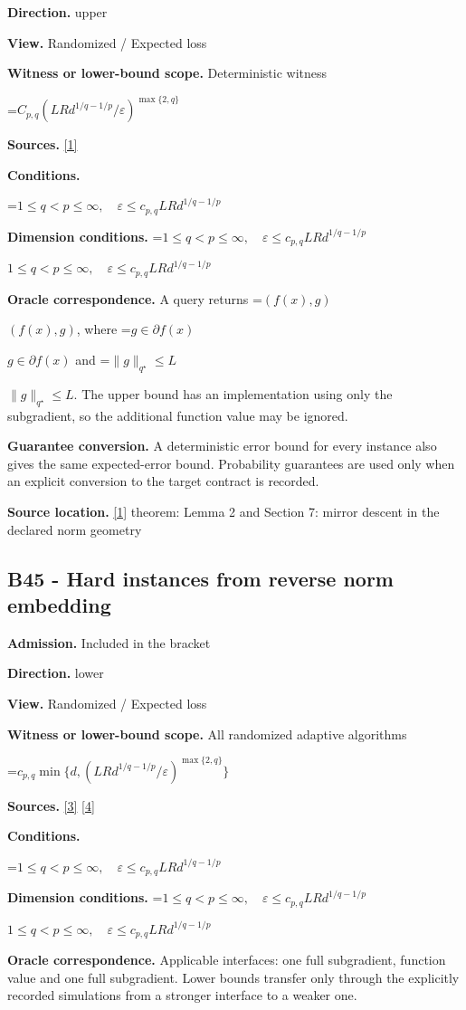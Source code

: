 \documentclass[10pt,a4paper]{article}
\newcommand{\AtlasMath}[1]{\par\begingroup\centering\setbox0=\hbox{$\displaystyle #1$}\ifdim\wd0>1.4\linewidth\typeout{ATLAS WIDE FORMULA: \the\wd0}\fi\ifdim\wd0>\linewidth\resizebox{\linewidth}{!}{\box0}\else\box0\fi\par\endgroup}
\newcommand{\AtlasInlineMath}[1]{\begingroup\setbox0=\hbox{$#1$}\ifdim\wd0>.4\linewidth\endgroup\AtlasMath{#1}\else\endgroup$#1$\fi}
\begin{document}
\textbf{Direction.} upper

\textbf{View.} Randomized / Expected loss

\textbf{Witness or lower-bound scope.} Deterministic witness

\AtlasMath{C_{p,q}(LRd^{1/q-1/p}/\varepsilon)^{\max\{2,q\}}}
\textbf{Sources.} \href{https://arxiv.org/pdf/1107.4080}{[1]}

\textbf{Conditions.} 
\AtlasMath{1\le q<p\le\infty,\quad\varepsilon\le c_{p,q}LRd^{1/q-1/p}}


\textbf{Dimension conditions.} \AtlasInlineMath{1\le q<p\le\infty,\quad\varepsilon\le c_{p,q}LRd^{1/q-1/p}}

\textbf{Oracle correspondence.} A query returns \AtlasInlineMath{(f(x),g)}, where \AtlasInlineMath{g\in\partial f(x)} and \AtlasInlineMath{\|g\|_{q^\star}\le L}. The upper bound has an implementation using only the subgradient, so the additional function value may be ignored.

\textbf{Guarantee conversion.} A deterministic error bound for every instance also gives the same expected-error bound. Probability guarantees are used only when an explicit conversion to the target contract is recorded.

\textbf{Source location.} \href{https://arxiv.org/pdf/1107.4080}{[1]} theorem: Lemma 2 and Section 7: mirror descent in the declared norm geometry

\subsection{B45 - Hard instances from reverse norm embedding}
\textbf{Admission.} Included in the bracket

\textbf{Direction.} lower

\textbf{View.} Randomized / Expected loss

\textbf{Witness or lower-bound scope.} All randomized adaptive algorithms

\AtlasMath{c_{p,q}\min\{d,(LRd^{1/q-1/p}/\varepsilon)^{\max\{2,q\}}\}}
\textbf{Sources.} \href{https://arxiv.org/pdf/2609.20701}{[3]} \href{https://arxiv.org/pdf/2609.20687}{[4]}

\textbf{Conditions.} 
\AtlasMath{1\le q<p\le\infty,\quad\varepsilon\le c_{p,q}LRd^{1/q-1/p}}


\textbf{Dimension conditions.} \AtlasInlineMath{1\le q<p\le\infty,\quad\varepsilon\le c_{p,q}LRd^{1/q-1/p}}

\textbf{Oracle correspondence.} Applicable interfaces: one full subgradient, function value and one full subgradient. Lower bounds transfer only through the explicitly recorded simulations from a stronger interface to a weaker one.
\end{document}
